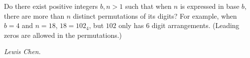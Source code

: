 Do there exist positive integers $b,n>1$ such that when $n$ is expressed in base $b$, there are more than $n$ distinct permutations of its digits? For example, when $b=4$ and $n=18$, $18 = 102_4$, but $102$ only has $6$ digit arrangements. (Leading zeros are allowed in the permutations.)

\textit{Lewis Chen.}